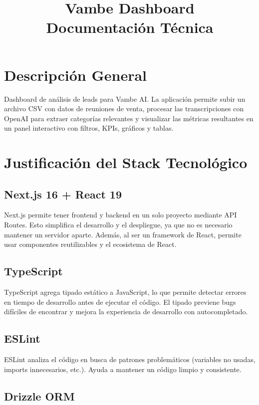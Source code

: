 \documentclass[11pt,a4paper]{article}
\title{\textbf{Vambe Dashboard} \\ Documentación Técnica}
\begin{document}
\maketitle

\section{Descripción General}

Dashboard de análisis de leads para Vambe AI. La aplicación permite subir un archivo CSV con datos de reuniones de venta, procesar las transcripciones con OpenAI para extraer categorías relevantes y visualizar las métricas resultantes en un panel interactivo con filtros, KPIs, gráficos y tablas.

\section{Justificación del Stack Tecnológico}

\subsection{Next.js 16 + React 19}

Next.js permite tener frontend y backend en un solo proyecto mediante API Routes. Esto simplifica el desarrollo y el despliegue, ya que no es necesario mantener un servidor aparte. Además, al ser un framework de React, permite usar componentes reutilizables y el ecosistema de React.

\subsection{TypeScript}

TypeScript agrega tipado estático a JavaScript, lo que permite detectar errores en tiempo de desarrollo antes de ejecutar el código. El tipado previene bugs difíciles de encontrar y mejora la experiencia de desarrollo con autocompletado.

\subsection{ESLint}

ESLint analiza el código en busca de patrones problemáticos (variables no usadas, imports innecesarios, etc.). Ayuda a mantener un código limpio y consistente.

\subsection{Drizzle ORM}
\end{document}
